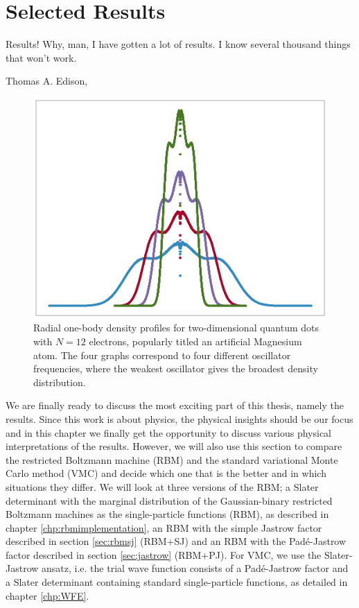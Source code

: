 \chapter{Selected Results} \label{chp:results}
\epigraph{Results! Why, man, I have gotten a lot of results. I know several thousand things that won't work.}{Thomas A. Edison, \supercite{noauthor_edisonian_nodate}}
\begin{figure}[H]
	\centering
	\includegraphics[scale=0.6]{../Images/art.eps}
	\caption{Radial one-body density profiles for two-dimensional quantum dots with $N=12$ electrons, popularly titled an artificial Magnesium atom. The four graphs correspond to four different oscillator frequencies, where the weakest oscillator gives the broadest density distribution.}
\end{figure}

We are finally ready to discuss the most exciting part of this thesis, namely the results. Since this work is about physics, the physical insights should be our focus and in this chapter we finally get the opportunity to discuss various physical interpretations of the results. However, we will also use this section to compare the restricted Boltzmann machine (RBM) and the standard variational Monte Carlo method (VMC) and decide which one that is the better and in which situations they differ. We will look at three versions of the RBM; a Slater determinant with the marginal distribution of the Gaussian-binary restricted Boltzmann machines as the single-particle functions (RBM), as described in chapter \ref{chp:rbmimplementation}, an RBM with the simple Jastrow factor described in section \ref{sec:rbmsj} (RBM+SJ) and an RBM with the Padé-Jastrow factor described in section \ref{sec:jastrow} (RBM+PJ). For VMC, we use the Slater-Jastrow ansatz, i.e. the trial wave function consists of a Padé-Jastrow factor and a Slater determinant containing standard single-particle functions, as detailed in chapter \ref{chp:WFE}. 


